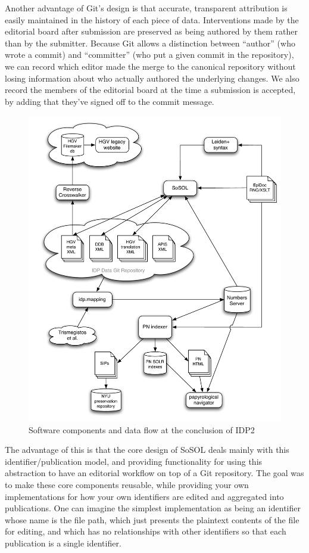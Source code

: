 \documentclass[]{article}
\begin{document}
Another advantage of Git's design is that accurate, transparent attribution is easily maintained in the history of each piece of data. Interventions made by the editorial board after submission are preserved as being authored by them rather than by the submitter. Because Git allows a distinction between “author” (who wrote a commit) and “committer” (who put a given commit in the repository), we can record which editor made the merge to the canonical repository without losing information about who actually  authored the underlying changes. We also record the members of the editorial board at the time a submission is accepted, by adding that they've signed off to the commit message.

\begin{figure}[!h]
  \centering
  \includegraphics[width=\textwidth]{images/TopLevelDataFlow4Proposal-HAC.pdf}
  \caption{Software components and data flow at the conclusion of IDP2\label{dataflow}}
\end{figure}

The advantage of this is that the core design of SoSOL deals mainly with this identifier/publication model, and providing functionality for using this abstraction to have an editorial workflow on top of a Git repository. The goal was to make these core components reusable, while providing your own implementations for how your own identifiers are edited and aggregated into publications. One can imagine the simplest implementation as being an identifier whose name is the file path, which just presents the plaintext contents of the file for editing, and which has no relationships with other identifiers so that each publication is a single identifier.
\end{document}
